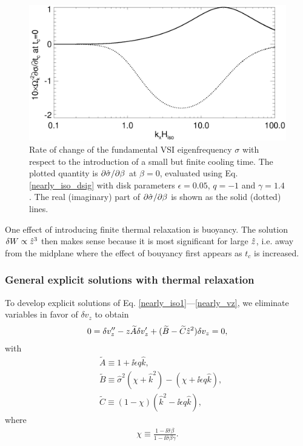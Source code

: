 \begin{figure}
  \includegraphics[width=\linewidth]{figures/domegadbeta}
  \caption{Rate of change of the fundamental VSI eigenfrequency
    $\sigma$ with respect to the introduction of a small but finite
    cooling time. The plotted quantity is $\partial\hat{\sigma}/\partial\beta$ at $\beta=0$, evaluated using
    Eq. \ref{nearly_iso_dsig} with 
    disk parameters $\epsilon=0.05$, $q=-1$ and $\gamma=1.4$. The real
    (imaginary) part of $\partial\hat{\sigma}/\partial\beta$ is shown as the solid
    (dotted) lines. 
    \label{domegadbeta}}  
\end{figure}   

One effect of introducing finite thermal relaxation is buoyancy. %
The solution $\delta W\propto\hat{z}^3$ then makes sense because it
is most significant for large $\hat{z}$, i.e. away from the midplane
where the effect of bouyancy first appears as $t_c$ is increased. 

\subsubsection{General explicit solutions with thermal relaxation}
To develop explicit solutions of
Eq. \ref{nearly_iso1}---\ref{nearly_vz}, we eliminate variables in
favor of $\delta v_z$ to obtain
\begin{align}
  0 = \delta v_z^{\prime\prime} - z \widetilde{A}\delta v_z^\prime +
  (\widetilde{B} - \widetilde{C}\hat{z}^2)\delta v_z = 0,\label{nearly_iso_explicit}
\end{align}
with
\begin{align}
  &\widetilde{A} \equiv 1 + \ii \epsilon q \hat{k},\\
  &\widetilde{B} \equiv \hat{\sigma}^2\left(\chi + \hat{k}^2\right) -
  \left(\chi + \ii \epsilon q \hat{k}\right),\\
  &\widetilde{C} \equiv \left(1-\chi\right)\left(\hat{k}^2 - \ii
      \epsilon q\hat{k}\right),
\end{align}
where
\begin{align}
  \chi \equiv \frac{1-\ii\hat{\sigma}\beta}{1-\ii\hat{\sigma}\beta\gamma}.
\end{align}

